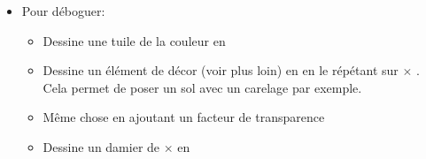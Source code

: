 \documentclass[11pt]{article}
\begin{document}
\begin{itemize}
\begin{itemize}
        Redéfinit la taille de la fenêtre en pixels. Défini à 1024 $\times$ 665 par défaut.

        \item {}
        
        Redéfinit la taille des tuiles en pixels. Défini à 100 $\times$ 100 par défaut.

        \item {}
        
            Redéfinit la vitesse d'animation en nombre d'images par seconde. Fixé à 50 pfs par défaut.

        \item {}
        
            Redéfinit la position du dessin dans la fenêtre. Défini à (0, 0) par défaut, c'est-à-dire au centre de la fenêtre.

    \end{itemize}

    \item Pour déboguer:

    \begin{itemize}
        \item {}

            Dessine une tuile de la couleur en 


        \item {}

            Dessine un élément de décor (voir plus loin) en  en le répétant sur 
             $\times$ .
            Cela permet de poser un sol avec un carelage par exemple.

        \item {}

            Même chose en ajoutant un facteur de transparence 
            
        \item {}
        
            Dessine un damier de $\times$  en 
    \end{itemize}

\end{itemize}
\end{document}
